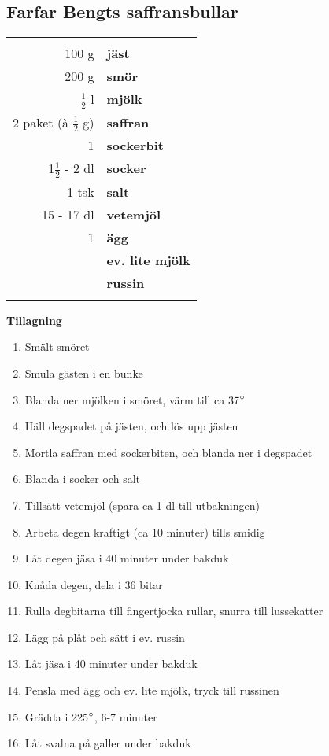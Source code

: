 \clearpage

\subsection{Farfar Bengts saffransbullar}

\begin{table}[H]
	\begin{tabular}{rl}
	\hline
	&\\
		100 g & \textbf{jäst} \\
		200 g & \textbf{smör} \\
		$\frac{1}{2}$ l & \textbf{mjölk} \\
		2 paket (à $\frac{1}{2}$ g) & \textbf{saffran} \\
		1 & \textbf{sockerbit} \\
		1$\frac{1}{2}$ - 2 dl & \textbf{socker} \\
		1 tsk & \textbf{salt} \\
		15 - 17 dl & \textbf{vetemjöl} \\
		1 & \textbf{ägg} \\
		& \textbf{ev. lite mjölk} \\
		& \textbf{russin} \\
	&\\
	\hline
	\end{tabular}
\end{table}

\begin{multicols*}{2}

\noindent \textbf{Tillagning}
\begin{enumerate}
	\itemsep0cm
	\item Smält smöret
	\item Smula gästen i en bunke
	\item Blanda ner mjölken i smöret, värm till ca 37$\degree$
	\item Häll degspadet på jästen, och lös upp jästen
	\item Mortla saffran med sockerbiten, och blanda ner i degspadet
	\item	Blanda i socker och salt
	\item Tillsätt vetemjöl (spara ca 1 dl till utbakningen)
	\item Arbeta degen kraftigt (ca 10 \mbox{minuter}) tills smidig
	\item Låt degen jäsa i 40 minuter \mbox{under} bakduk
	\item Knåda degen, dela i 36 bitar
	\item Rulla degbitarna till finger\-tjocka rullar, snurra till \mbox{lussekatter}
	\item Lägg på plåt och sätt i ev. \mbox{russin}
	\item Låt jäsa i 40 minuter under bakduk
	\item Pensla med ägg och ev. lite mjölk, tryck till russinen
	\item Grädda i 225$\degree$,  6-7 minuter
	\item Låt svalna på galler under bakduk
\end{enumerate}

\end{multicols*}

